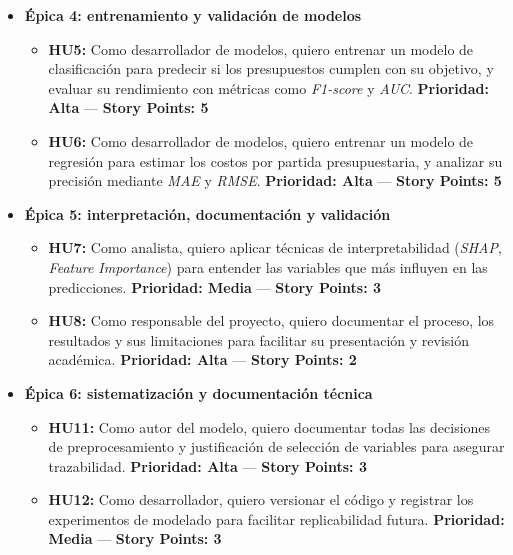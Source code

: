 \documentclass[
11pt, %
]{charter}
\begin{document}
\begin{itemize}
  \item \textbf{Épica 4: entrenamiento y validación de modelos}
    \begin{itemize}
      \item \textbf{HU5:} Como desarrollador de modelos, quiero entrenar un modelo de clasificación para predecir si los presupuestos cumplen con su objetivo, y evaluar su rendimiento con métricas como \textit{F1-score} y \textit{AUC}.  
      \newline \textbf{Prioridad: Alta} — \textbf{Story Points: 5}

      \item \textbf{HU6:} Como desarrollador de modelos, quiero entrenar un modelo de regresión para estimar los costos por partida presupuestaria, y analizar su precisión mediante \textit{MAE} y \textit{RMSE}.  
      \newline \textbf{Prioridad: Alta} — \textbf{Story Points: 5}
    \end{itemize}

  \item \textbf{Épica 5: interpretación, documentación y validación}
    \begin{itemize}
      \item \textbf{HU7:} Como analista, quiero aplicar técnicas de interpretabilidad (\textit{SHAP}, \textit{Feature Importance}) para entender las variables que más influyen en las predicciones.  
      \newline \textbf{Prioridad: Media} — \textbf{Story Points: 3}

      \item \textbf{HU8:} Como responsable del proyecto, quiero documentar el proceso, los resultados y sus limitaciones para facilitar su presentación y revisión académica.  
      \newline \textbf{Prioridad: Alta} — \textbf{Story Points: 2}
    \end{itemize}

  \item \textbf{Épica 6: sistematización y documentación técnica}
    \begin{itemize}
      \item \textbf{HU11:} Como autor del modelo, quiero documentar todas las decisiones de preprocesamiento y justificación de selección de variables para asegurar trazabilidad.  
      \newline \textbf{Prioridad: Alta} — \textbf{Story Points: 3}

      \item \textbf{HU12:} Como desarrollador, quiero versionar el código y registrar los experimentos de modelado para facilitar replicabilidad futura.  
      \newline \textbf{Prioridad: Media} — \textbf{Story Points: 3}
    \end{itemize}


\end{itemize}
\end{document}
